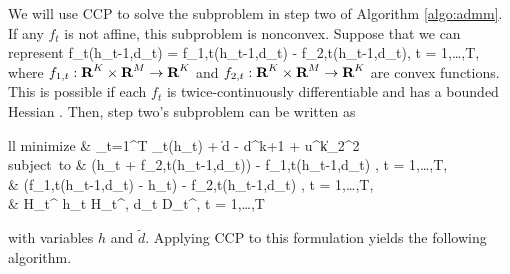 \documentclass[12pt]{article}
\begin{document}
We will use CCP to solve the subproblem in step two of Algorithm \ref{algo:admm}. If any $f_t$ is not affine, this subproblem is nonconvex. Suppose that we can represent
\BEQ
\label{cond:decomp}
	f_t(h_{t-1},d_t) = f_{1,t}(h_{t-1},d_t) - f_{2,t}(h_{t-1},d_t), \quad t = 1,\ldots,T,
\EEQ
where $f_{1,t}: {\mbox{\bf R}}^K \times {\mbox{\bf R}}^M \rightarrow {\mbox{\bf R}}^K$ and $f_{2,t}: {\mbox{\bf R}}^K \times {\mbox{\bf R}}^M \rightarrow {\mbox{\bf R}}^K$ are convex functions. This is possible if each $f_t$ is twice-continuously differentiable and has a bounded Hessian \cite[Theorem 1]{YuilleRangarajan:2003}. Then, step two's subproblem can be written as
\BEQ
\label{prob:ccp_health}
	\begin{array}{ll}
		\mbox{minimize} & \sum_{t=1}^T \psi_t(h_t) + \|\tilde d - d^{k+1} + u^k\|_2^2 \\
		\mbox{subject to} & (h_t + f_{2,t}(h_{t-1},\tilde d_t)) - f_{1,t}(h_{t-1},\tilde d_t) , \quad t = 1,\ldots,T, \\
		& (f_{1,t}(h_{t-1},\tilde d_t) - h_t) - f_{2,t}(h_{t-1},\tilde d_t) , \quad t = 1,\ldots,T,\\
		& H_t^{\min} \leq h_t \leq H_t^{\max},  \leq \tilde d_t \leq D_t^{\max}, \quad t = 1,\ldots,T
	\end{array}
\EEQ
with variables $h$ and $\tilde d$. Applying CCP to this formulation yields the following algorithm.
\end{document}
